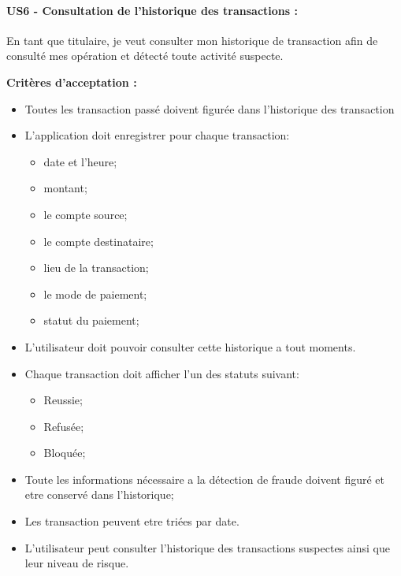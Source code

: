 \hypertarget{us6---consultation-de-lhistorique-des-transactions}{%
\paragraph{US6 - Consultation de l'historique des transactions
:}\label{us6---consultation-de-lhistorique-des-transactions}}

En tant que titulaire, je veut consulter mon historique de transaction
afin de consulté mes opération et détecté toute activité suspecte.

\textbf{Critères d'acceptation :}

\begin{itemize}
\tightlist
\item
  Toutes les transaction passé doivent figurée dans l'historique des
  transaction
\item
  L'application doit enregistrer pour chaque transaction:

  \begin{itemize}
  \tightlist
  \item
    date et l'heure;
  \item
    montant;
  \item
    le compte source;
  \item
    le compte destinataire;
  \item
    lieu de la transaction;
  \item
    le mode de paiement;
  \item
    statut du paiement;
  \end{itemize}
\item
  L'utilisateur doit pouvoir consulter cette historique a tout moments.
\item
  Chaque transaction doit afficher l'un des statuts suivant:

  \begin{itemize}
  \tightlist
  \item
    Reussie;
  \item
    Refusée;
  \item
    Bloquée;
  \end{itemize}
\item
  Toute les informations nécessaire a la détection de fraude doivent
  figuré et etre conservé dans l'historique;
\item
  Les transaction peuvent etre triées par date.
\item
  L'utilisateur peut consulter l'historique des transactions suspectes
  ainsi que leur niveau de risque.
\end{itemize}


